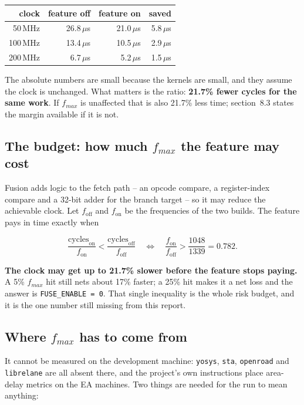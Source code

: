 \documentclass[11pt]{article}
\begin{document}
\begin{center}
\begin{tabular}{rrrr}
\toprule
clock & feature off & feature on & saved \\
\midrule
50\,MHz & 26.8\,$\mu$s & 21.0\,$\mu$s & 5.8\,$\mu$s \\
100\,MHz & 13.4\,$\mu$s & 10.5\,$\mu$s & 2.9\,$\mu$s \\
200\,MHz & 6.7\,$\mu$s & 5.2\,$\mu$s & 1.5\,$\mu$s \\
\bottomrule
\end{tabular}
\end{center}

The absolute numbers are small because the kernels are small, and they assume the clock is
unchanged. What matters is the ratio: \textbf{21.7\% fewer cycles for the same work}. If
$f_{max}$ is unaffected that is also 21.7\% less time; section~8.3 states the margin
available if it is not.

\subsection{The budget: how much $f_{max}$ the feature may cost}

Fusion adds logic to the fetch path -- an opcode compare, a register-index compare and a
32-bit adder for the branch target -- so it may reduce the achievable clock. Let
$f_{\text{off}}$ and $f_{\text{on}}$ be the frequencies of the two builds. The feature pays
in time exactly when

\[
\frac{\text{cycles}_{\text{on}}}{f_{\text{on}}} < \frac{\text{cycles}_{\text{off}}}{f_{\text{off}}}
\quad\Longleftrightarrow\quad
\frac{f_{\text{on}}}{f_{\text{off}}} > \frac{1048}{1339} = 0.782 .
\]

\textbf{The clock may get up to 21.7\% slower before the feature stops paying.} A 5\%
$f_{max}$ hit still nets about 17\% faster; a 25\% hit makes it a net loss and the answer is
\texttt{FUSE\_ENABLE = 0}. That single inequality is the whole risk budget, and it is the
one number still missing from this report.

\subsection{Where $f_{max}$ has to come from}

It cannot be measured on the development machine: \texttt{yosys}, \texttt{sta},
\texttt{openroad} and \texttt{librelane} are all absent there, and the project's own
instructions place area-delay metrics on the EA machines. Two things are needed for the run
to mean anything:
\end{document}
